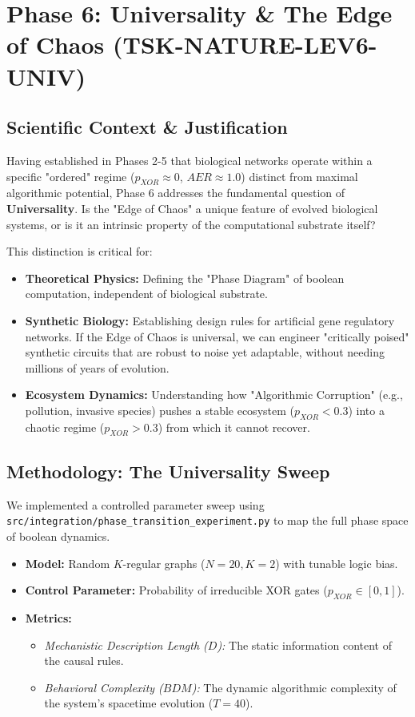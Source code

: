 \documentclass{article}
\begin{document}
\section{Phase 6: Universality \& The Edge of Chaos (TSK-NATURE-LEV6-UNIV)}

\subsection{Scientific Context \& Justification}
Having established in Phases 2-5 that biological networks operate within a specific "ordered" regime ($p_{XOR} \approx 0$, $AER \approx 1.0$) distinct from maximal algorithmic potential, Phase 6 addresses the fundamental question of \textbf{Universality}. Is the "Edge of Chaos" a unique feature of evolved biological systems, or is it an intrinsic property of the computational substrate itself?

This distinction is critical for:
\begin{itemize}
    \item \textbf{Theoretical Physics:} Defining the "Phase Diagram" of boolean computation, independent of biological substrate.
    \item \textbf{Synthetic Biology:} Establishing design rules for artificial gene regulatory networks. If the Edge of Chaos is universal, we can engineer "critically poised" synthetic circuits that are robust to noise yet adaptable, without needing millions of years of evolution.
    \item \textbf{Ecosystem Dynamics:} Understanding how "Algorithmic Corruption" (e.g., pollution, invasive species) pushes a stable ecosystem ($p_{XOR} < 0.3$) into a chaotic regime ($p_{XOR} > 0.3$) from which it cannot recover.
\end{itemize}

\subsection{Methodology: The Universality Sweep}
We implemented a controlled parameter sweep using \texttt{src/integration/phase\_transition\_experiment.py} to map the full phase space of boolean dynamics.
\begin{itemize}
    \item \textbf{Model:} Random $K$-regular graphs ($N=20, K=2$) with tunable logic bias.
    \item \textbf{Control Parameter:} Probability of irreducible XOR gates ($p_{XOR} \in [0, 1]$).
    \item \textbf{Metrics:}
    \begin{itemize}
        \item \textit{Mechanistic Description Length ($D$):} The static information content of the causal rules.
        \item \textit{Behavioral Complexity ($BDM$):} The dynamic algorithmic complexity of the system's spacetime evolution ($T=40$).
    \end{itemize}
\end{itemize}
\end{document}
